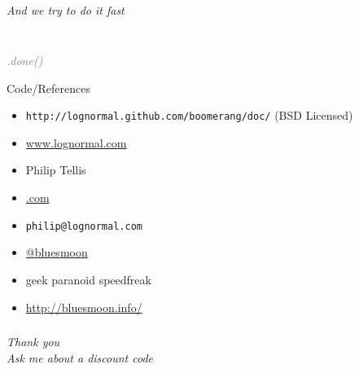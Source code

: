\documentclass{beamer}
\newcommand{\innersplash}[1]{
  \begin{center}
    \large \textrm{\textit{ #1 } }
  \end{center}
}
\newcommand{\splashslide}[2][{}]{
  \begin{frame}
  \frametitle{#1}
  \innersplash{#2}
  \end{frame}
}
\newcommand{\leadinslide}[2]{
  \splashslide{
     {\fontsize{150}{20}\selectfont{\raisebox{0pt}[90pt][0pt]{\textcolor{light-gray}{#1}}}} \\ \huge \textcolor{gray}{#2}
  }
}
\begin{document}
\splashslide{And we try to do it fast}

\leadinslide{--}{.done()}

\begin{frame}{Code/References}
  \begin{itemize}
    \item \texttt{http://lognormal.github.com/boomerang/doc/} (BSD Licensed)
    \item \href{http://www.lognormal.com}{www.lognormal.com}
  \end{itemize}
\end{frame}

\begin{frame}
  \begin{itemize}
  \item Philip Tellis
  \item \href{http://www.lognormal.com/}{\textrm{\textcolor{med-gray}{.com}}}
  \item \small{\texttt{philip@lognormal.com}}
  \item \href{http://twitter.com/bluesmoon}{@bluesmoon}
  \item geek paranoid speedfreak
  \item \href{http://bluesmoon.info/}{http://bluesmoon.info/}
  \end{itemize}
\end{frame}

\splashslide{\Huge Thank you \\ \small Ask me about a discount code }
\end{document}
